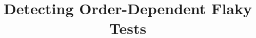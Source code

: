 \documentclass[10pt,conference]{IEEEtran}
\begin{document}
\title{Detecting Order-Dependent Flaky Tests}
\author{}
\maketitle


\end{document}

